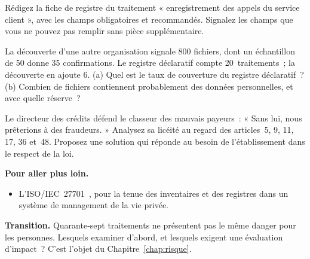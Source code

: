 \begin{boxexo}[title={\ding{45}\quad Exercice~4.2. Une fiche de registre \niveaumoyen}]
Rédigez la fiche de registre du traitement « enregistrement des appels du
service client », avec les champs obligatoires et recommandés. Signalez les
champs que vous ne pouvez pas remplir sans pièce supplémentaire.
\end{boxexo}

\begin{boxexo}[title={\ding{45}\quad Exercice~4.3. Mesurer la complétude \niveaumoyen}]
La découverte d'une autre organisation signale 800 fichiers, dont un
échantillon de 50 donne 35 confirmations. Le registre déclaratif compte
20~traitements~; la découverte en ajoute 6. (a) Quel est le taux de
couverture du registre déclaratif~? (b) Combien de fichiers contiennent
probablement des données personnelles, et avec quelle réserve~?
\end{boxexo}

\begin{boxexo}[title={\ding{45}\quad Exercice~4.4. La liste noire \niveauexpert}]
Le directeur des crédits défend le classeur des mauvais payeurs~: « Sans
lui, nous prêterions à des fraudeurs. » Analysez sa licéité au regard des
articles~5, 9, 11, 17, 36 et~48. Proposez une solution qui réponde au
besoin de l'établissement dans le respect de la loi.
\end{boxexo}

\bigskip

\begin{boxinfo}
\textbf{Pour aller plus loin.}
\begin{itemize}
    \item L'ISO/IEC~27701~\cite{iso27701}, pour la tenue des inventaires et
          des registres dans un système de management de la vie privée.
\end{itemize}
\end{boxinfo}

\begin{boxinfo}
\textbf{Transition.} Quarante-sept traitements ne présentent pas le même
danger pour les personnes. Lesquels examiner d'abord, et lesquels exigent
une évaluation d'impact~? C'est l'objet du Chapitre~\ref{chap:risque}.
\end{boxinfo}
